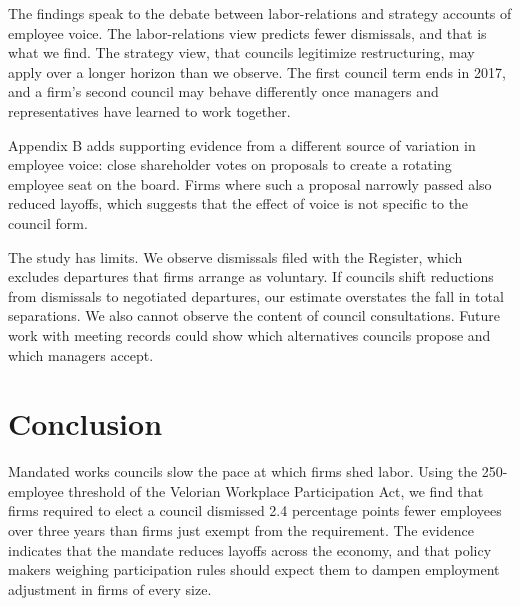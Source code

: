 \documentclass[12pt]{article}
\begin{document}
The findings speak to the debate between labor-relations and strategy accounts of employee voice. The labor-relations view predicts fewer dismissals, and that is what we find. The strategy view, that councils legitimize restructuring, may apply over a longer horizon than we observe. The first council term ends in 2017, and a firm's second council may behave differently once managers and representatives have learned to work together.

Appendix B adds supporting evidence from a different source of variation in employee voice: close shareholder votes on proposals to create a rotating employee seat on the board. Firms where such a proposal narrowly passed also reduced layoffs, which suggests that the effect of voice is not specific to the council form.

The study has limits. We observe dismissals filed with the Register, which excludes departures that firms arrange as voluntary. If councils shift reductions from dismissals to negotiated departures, our estimate overstates the fall in total separations. We also cannot observe the content of council consultations. Future work with meeting records could show which alternatives councils propose and which managers accept.

\section{Conclusion}

Mandated works councils slow the pace at which firms shed labor. Using the 250-employee threshold of the Velorian Workplace Participation Act, we find that firms required to elect a council dismissed 2.4 percentage points fewer employees over three years than firms just exempt from the requirement. The evidence indicates that the mandate reduces layoffs across the economy, and that policy makers weighing participation rules should expect them to dampen employment adjustment in firms of every size.
\end{document}
